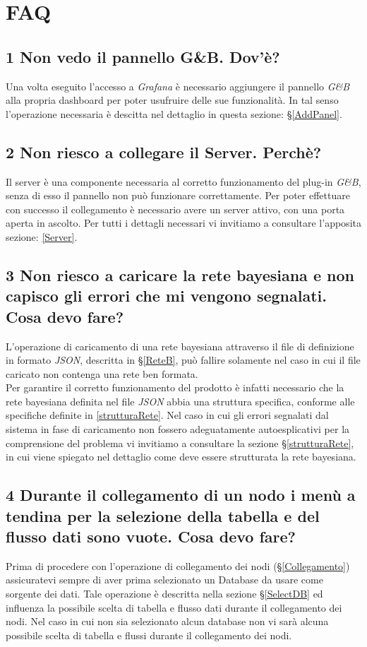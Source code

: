 \section{FAQ}\label{FAQ}


\subsection*{1 Non vedo il pannello G\&B. Dov'è?}
Una volta eseguito l'accesso a \textit{Grafana} è necessario aggiungere il pannello \textit{G\&B} alla propria dashboard per poter usufruire delle sue funzionalità. In tal senso l'operazione necessaria è descitta nel dettaglio in questa sezione: §\ref{AddPanel}.

\subsection*{2 Non riesco a collegare il Server. Perchè?}
Il server è una componente necessaria al corretto funzionamento del plug-in \textit{G\&B}, senza di esso il pannello non può funzionare correttamente. Per poter effettuare con successo il collegamento è necessario avere un server attivo, con una porta aperta in ascolto. Per tutti i dettagli necessari vi invitiamo a consultare l'apposita sezione: \ref{Server}.

\subsection*{3 Non riesco a caricare la rete bayesiana e non capisco gli errori che mi vengono segnalati. Cosa devo fare?}
L'operazione di caricamento di una rete bayesiana attraverso il file di definizione in formato \textit{JSON}, descritta in §\ref{ReteB}, può fallire solamente nel caso in cui il file caricato non contenga una rete ben formata.\\
Per garantire il corretto funzionamento del prodotto è infatti necessario che la rete bayesiana definita nel file \textit{JSON} abbia una struttura specifica, conforme alle specifiche definite in \ref{strutturaRete}. Nel caso in cui gli errori segnalati dal sistema in fase di caricamento non fossero adeguatamente autoesplicativi per la comprensione del problema vi invitiamo a consultare la sezione §\ref{strutturaRete}, in cui viene spiegato nel dettaglio come deve essere strutturata la rete bayesiana.

\subsection*{4 Durante il collegamento di un nodo i menù a tendina per la selezione della tabella e del flusso dati sono vuote. Cosa devo fare?}
Prima di procedere con l'operazione di collegamento dei nodi (§\ref{Collegamento}) assicuratevi sempre di aver prima selezionato un Database da usare come sorgente dei dati. Tale operazione è descritta nella sezione §\ref{SelectDB} ed influenza la possibile scelta di tabella e flusso dati durante il collegamento dei nodi. Nel caso in cui non sia selezionato alcun database non vi sarà alcuna possibile scelta di tabella e flussi durante il collegamento dei nodi.


